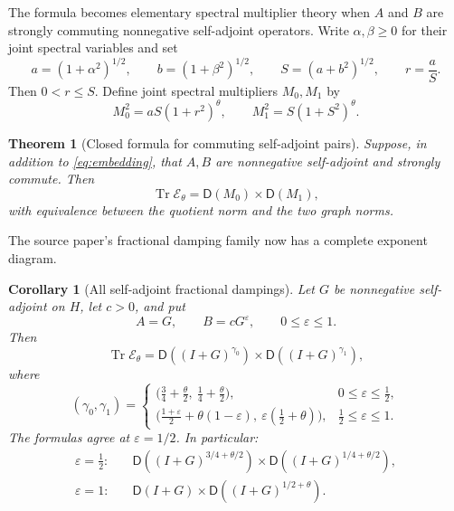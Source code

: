 \documentclass[11pt]{article}
\newtheorem{theorem}{Theorem}
\newtheorem{corollary}{Corollary}
\theoremstyle{remark}
\newcommand{\cE}{\mathcal E}
\newcommand{\Tr}{\operatorname{Tr}}
\newcommand{\Dom}{\mathsf D}
\begin{document}
The formula becomes elementary spectral multiplier theory when $A$ and $B$
are strongly commuting nonnegative self-adjoint operators.  Write
$\alpha,\beta\ge0$ for their joint spectral variables and set
\begin{equation}\label{eq:scales}
 a=(1+\alpha^2)^{1/2},\qquad b=(1+\beta^2)^{1/2},\qquad
 S=(a+b^2)^{1/2},\qquad r=\frac aS.
\end{equation}
Then $0<r\le S$.  Define joint spectral multipliers $M_0,M_1$ by
\begin{equation}\label{eq:multipliers}
 M_0^2=aS(1+r^2)^\theta,
 \qquad
 M_1^2=S(1+S^2)^\theta.
\end{equation}

\begin{theorem}[Closed formula for commuting self-adjoint pairs]\label{thm:spectral}
Suppose, in addition to \eqref{eq:embedding}, that $A,B$ are nonnegative
self-adjoint and strongly commute.  Then
\begin{equation}\label{eq:spectralanswer}
 \boxed{\quad
 \Tr\cE_\theta=\Dom(M_0)\times\Dom(M_1),
 \quad}
\end{equation}
with equivalence between the quotient norm and the two graph norms.
\end{theorem}

The source paper's fractional damping family now has a complete exponent
diagram.

\begin{corollary}[All self-adjoint fractional dampings]\label{cor:phase}
Let $G$ be nonnegative self-adjoint on $H$, let $c>0$, and put
\[
 A=G,\qquad B=cG^\varepsilon,\qquad 0\le\varepsilon\le1.
\]
Then
\begin{equation}\label{eq:phaseanswer}
 \Tr\cE_\theta
 =\Dom((I+G)^{\gamma_0})
 \times\Dom((I+G)^{\gamma_1}),
\end{equation}
where
\begin{equation}\label{eq:phase}
 (\gamma_0,\gamma_1)=
 \begin{cases}
 \bigl(\frac34+\frac\theta2,\ \frac14+\frac\theta2\bigr),
   &0\le\varepsilon\le\frac12,\\[1mm]
 \bigl(\frac{1+\varepsilon}{2}+\theta(1-\varepsilon),\
       \varepsilon(\frac12+\theta)\bigr),
   &\frac12\le\varepsilon\le1.
 \end{cases}
\end{equation}
The formulas agree at $\varepsilon=1/2$.  In particular:
\begin{align*}
 \varepsilon=\tfrac12:&\quad
 \Dom((I+G)^{3/4+\theta/2})
 \times\Dom((I+G)^{1/4+\theta/2}),\\
 \varepsilon=1:&\quad
 \Dom(I+G)\times\Dom((I+G)^{1/2+\theta}).
\end{align*}
\end{corollary}
\end{document}
